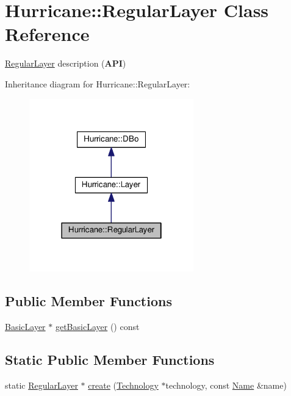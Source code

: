\hypertarget{classHurricane_1_1RegularLayer}{}\section{Hurricane\+:\+:Regular\+Layer Class Reference}
\label{classHurricane_1_1RegularLayer}


\mbox{\hyperlink{classHurricane_1_1RegularLayer}{Regular\+Layer}} description ({\bfseries A\+PI})  




Inheritance diagram for Hurricane\+:\+:Regular\+Layer\+:\nopagebreak
\begin{figure}[H]
\begin{center}
\leavevmode
\includegraphics[width=202pt]{classHurricane_1_1RegularLayer__inherit__graph}
\end{center}
\end{figure}
\subsection*{Public Member Functions}
\begin{DoxyCompactItemize}
\item 
\mbox{\hyperlink{classHurricane_1_1BasicLayer}{Basic\+Layer}} $\ast$ \mbox{\hyperlink{classHurricane_1_1RegularLayer_a148c5839b544c2a0aa5d25be5958dfaf}{get\+Basic\+Layer}} () const
\end{DoxyCompactItemize}
\subsection*{Static Public Member Functions}
\begin{DoxyCompactItemize}
\item 
static \mbox{\hyperlink{classHurricane_1_1RegularLayer}{Regular\+Layer}} $\ast$ \mbox{\hyperlink{classHurricane_1_1RegularLayer_a88c2d5516f42b033ae2fdc0797e3dae1}{create}} (\mbox{\hyperlink{classHurricane_1_1Technology}{Technology}} $\ast$technology, const \mbox{\hyperlink{classHurricane_1_1Name}{Name}} \&name)
\end{DoxyCompactItemize}
